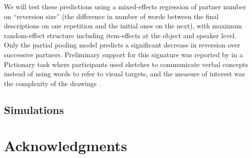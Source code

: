 \documentclass[11pt, floatsintext]{apa6}
\begin{document}
We will test these predictions using a mixed-effects regression of partner number on ``reversion size'' (the difference in number of words between the final descriptions on one repetition and the initial ones on the next), with maximum random-effect structure including item-effects at the object and speaker level.  
Only the partial pooling model predicts a significant decrease in reversion over successive partners. 
Preliminary support for this signature was reported by  in a Pictionary task where participants used sketches to communicate verbal concepts instead of using words to refer to visual targets, and the measure of interest was the  complexity of the drawings \cite<see also>{garrod_conversation_1994}.

\subsection{Simulations}

\section{\bf Acknowledgments}
\small



\end{document}
